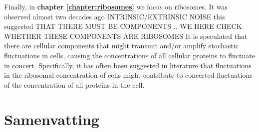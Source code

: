 Finally, in \textbf{chapter \ref{chapter:ribosomes}} we focus on ribosomes.
%
It was observed almost two decades ago 
INTRINSIC/EXTRINSIC NOISE
this suggested 
THAT THERE MUST BE COMPONENTS ..
WE HERE CHECK WHETHER THESE COMPONENTS ARE RIBOSOMES
%
%
It is speculated that there are cellular components that might transmit and/or amplify stochastic fluctuations in cells, 
causing the concentrations of all cellular proteins to fluctuate in concert.
%
%
%
Specifically, it has often been suggested in literature that fluctuations in the ribosomal concentration of cells might contribute to 
concerted fluctuations of the concentration of all proteins in the cell. 
%

 



\chapter*{Samenvatting}


